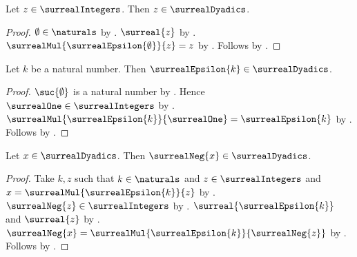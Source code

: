 \begin{theorem}\label{surreal_integer_is_dyadic}
    Let $z\in\surrealIntegers$.
    Then $z\in\surrealDyadics$.
\end{theorem}
\begin{proof}
    $\emptyset\in\naturals$ by .
    $\surreal{z}$ by .
    $\surrealMul{\surrealEpsilon{\emptyset}}{z}=z$
        by .
    Follows by .
\end{proof}

\begin{theorem}\label{surreal_epsilon_is_dyadic}
    Let $k$ be a natural number.
    Then $\surrealEpsilon{k}\in\surrealDyadics$.
\end{theorem}
\begin{proof}
    $\suc{\emptyset}$ is a natural number
        by .
    Hence $\surrealOne\in\surrealIntegers$
        by .
    $\surrealMul{\surrealEpsilon{k}}{\surrealOne}
        =\surrealEpsilon{k}$
        by .
    Follows by .
\end{proof}

\begin{theorem}\label{surreal_dyadic_negation_closed}
    Let $x\in\surrealDyadics$.
    Then $\surrealNeg{x}\in\surrealDyadics$.
\end{theorem}
\begin{proof}
    Take $k,z$ such that $k\in\naturals$ and
        $z\in\surrealIntegers$ and
        $x=\surrealMul{\surrealEpsilon{k}}{z}$
        by .
    $\surrealNeg{z}\in\surrealIntegers$
        by .
    $\surreal{\surrealEpsilon{k}}$ and $\surreal{z}$
        by .
    $\surrealNeg{x}
        =\surrealMul{\surrealEpsilon{k}}{\surrealNeg{z}}$
        by .
    Follows by .
\end{proof}


